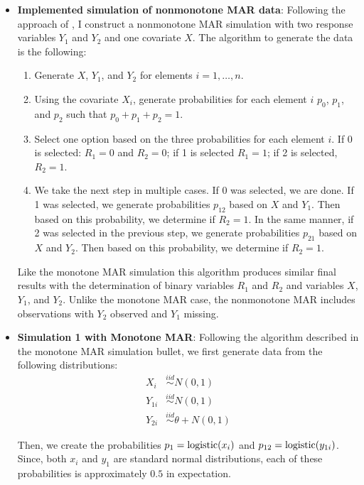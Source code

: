 \begin{itemize}
  \item \textbf{Implemented simulation of nonmonotone MAR data}: 
    Following the approach of \cite{robins1997non}, I construct a nonmonotone
    MAR simulation with two response variables $Y_1$ and $Y_2$ and one covariate
    $X$. The algorithm to generate the data is the following:
    \begin{enumerate}
        \item Generate $X$, $Y_1$, and $Y_2$ for elements $i = 1, \dots, n$.
        \item Using the covariate $X_i$, generate probabilities for each element
          $i$ $p_0$, $p_1$, and $p_2$ such that $p_0 + p_1 + p_2 = 1$. 
        \item Select one option based on the three probabilities for each
          element $i$. If 0 is selected: $R_1 = 0$ and $R_2 = 0$; if 1 is
          selected $R_1 = 1$; if 2 is selected, $R_2 = 1$.
        \item We take the next step in multiple cases. If 0 was selected, we are
          done. If 1 was selected, we generate probabilities $p_{12}$ based on
          $X$ and $Y_1$. Then based on this probability, we determine if $R_2 =
          1$. In the same manner, if 2 was selected in the previous step, we
          generate probabilities $p_{21}$ based on $X$ and $Y_2$. Then based on
          this probability, we determine if $R_2 = 1$.
    \end{enumerate}
    Like the monotone MAR simulation this algorithm produces similar final
    results with the determination of binary variables $R_1$ and $R_2$ and
    variables $X$, $Y_1$, and $Y_2$. Unlike the monotone MAR case, the
    nonmonotone MAR includes observations with $Y_2$ observed and $Y_1$ missing.
    
  \item \textbf{Simulation 1 with Monotone MAR}:
    Following the algorithm described in the monotone MAR simulation bullet, 
    we first generate data from the following distributions:
    \begin{align*}
        X_i &\stackrel{iid}{\sim} N(0, 1) \\
        Y_{1i} &\stackrel{iid}{\sim} N(0, 1)\\
        Y_{2i} &\stackrel{iid}{\sim} \theta + N(0, 1)
    \end{align*}

    Then, we create the probabilities $p_1 = {\text{logistic}}(x_i)$ and 
    $p_{12} = {\text{logistic}}(y_{1i})$.
    Since, both $x_i$ and $y_1$ are standard normal distributions, each of these
    probabilities is approximately $0.5$ in expectation.


\end{itemize}
